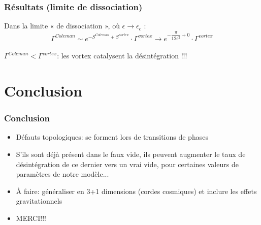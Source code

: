 \documentclass{beamer}
\begin{document}
\begin{frame}
\frametitle{Résultats (limite de dissociation)}
Dans la limite « de dissociation », où $\epsilon \rightarrow \epsilon_{c}$ :
\begin{equation*}
\Gamma^{Coleman} \sim e^{  -S^{Coleman} +S^{vortex} } \cdot \Gamma^{vortex} \rightarrow e^{  -\dfrac{\pi}{12 \epsilon^2} + 0 } \cdot \Gamma^{vortex}
\end{equation*}
~~\\
$\Gamma^{Coleman} <  \Gamma^{vortex}$: les vortex catalysent la désintégration !!!
\end{frame}



\section{Conclusion}


\begin{frame}
\frametitle{Conclusion}
\begin{itemize}
\item Défauts topologiques: se forment lors de transitions de phases
\item S'ils sont déjà présent dans le faux vide, ils peuvent augmenter le taux de désintégration de ce dernier vers un vrai vide, pour certaines valeurs de paramètres de notre modèle...
\item À faire: généraliser en 3+1 dimensions (cordes cosmiques) et inclure les effets gravitationnels
\item MERCI!!!
\end{itemize}
\end{frame}
\end{document}
